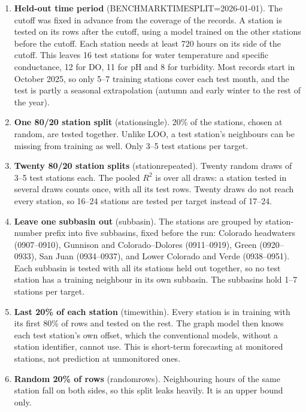 \documentclass[11pt]{article}
\newcommand{\codeus}{\textunderscore\allowbreak}
\newcommand{\code}[1]{{\ttfamily\let\_\codeus #1}}
\begin{document}
\begin{enumerate}
  \item \textbf{Held-out time period} (\code{BENCHMARK\_TIME\_SPLIT=2026-01-01}). The cutoff was fixed
        in advance from the coverage of the records. A station is tested on its rows after the
        cutoff, using a model trained on the other stations before the cutoff. Each station needs
        at least 720 hours on its side of the cutoff. This leaves 16 test stations for water
        temperature and specific conductance, 12 for DO, 11 for pH and 8 for turbidity. Most records
        start in October 2025, so only 5--7 training stations cover each test month, and the test
        is partly a seasonal extrapolation (autumn and early winter to the rest of the year).
  \item \textbf{One 80/20 station split} (\code{station\_single}). 20\% of the stations, chosen at
        random, are tested together. Unlike LOO, a test station's neighbours can be missing from
        training as well. Only 3--5 test stations per target.
  \item \textbf{Twenty 80/20 station splits} (\code{station\_repeated}). Twenty random draws of
        3--5 test stations each. The pooled $R^2$ is over all draws: a station tested in several
        draws counts once, with all its test rows. Twenty draws do not reach every station, so 16--24
        stations are tested per target instead of 17--24.
  \item \textbf{Leave one subbasin out} (\code{subbasin}). The stations are grouped by station-number
        prefix into five subbasins, fixed before the run: Colorado headwaters (0907--0910), Gunnison
        and Colorado--Dolores (0911--0919), Green (0920--0933), San Juan (0934--0937), and Lower
        Colorado and Verde (0938--0951). Each subbasin is tested with all its stations held out
        together, so no test station has a training neighbour in its own subbasin. The subbasins
        hold 1--7 stations per target.
  \item \textbf{Last 20\% of each station} (\code{time\_within}). Every station is in training with
        its first 80\% of rows and tested on the rest. The graph model then knows each test
        station's own offset, which the conventional models, without a station identifier, cannot
        use. This is short-term forecasting at monitored stations, not prediction at unmonitored
        ones.
  \item \textbf{Random 20\% of rows} (\code{random\_rows}). Neighbouring hours of the same station
        fall on both sides, so this split leaks heavily. It is an upper bound only.
\end{enumerate}
\end{document}
